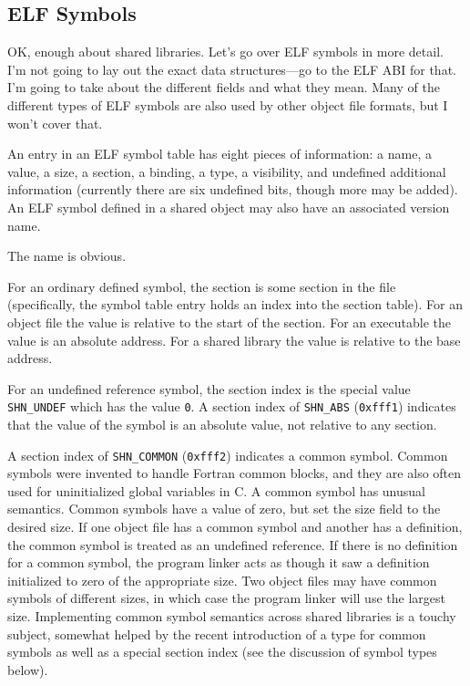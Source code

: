 \subsection{ELF Symbols}

OK, enough about shared libraries.  Let's go over ELF symbols in more detail.
I'm not going to lay out the exact data structures---go to the ELF ABI for
that.  I'm going to take about the different fields and what they mean.  Many
of the different types of ELF symbols are also used by other object file
formats, but I won't cover that.

An entry in an ELF symbol table has eight pieces of information: a name, a
value, a size, a section, a binding, a type, a visibility, and undefined
additional information (currently there are six undefined bits, though more may
be added).  An ELF symbol defined in a shared object may also have an
associated version name.

The name is obvious.

For an ordinary defined symbol, the section is some section in the file
(specifically, the symbol table entry holds an index into the section table).
For an object file the value is relative to the start of the section.  For an
executable the value is an absolute address.  For a shared library the value is
relative to the base address.

For an undefined reference symbol, the section index is the special value
\texttt{SHN\_UNDEF} which has the value \texttt{0}.  A section index of
\texttt{SHN\_ABS} (\texttt{0xfff1}) indicates that the value of the symbol is an
absolute value, not relative to any section.

A section index of \texttt{SHN\_COMMON} (\texttt{0xfff2}) indicates a common symbol.
Common symbols were invented to handle Fortran common blocks, and they are also
often used for uninitialized global variables in C.  A common symbol has
unusual semantics.  Common symbols have a value of zero, but set the size field
to the desired size.  If one object file has a common symbol and another has a
definition, the common symbol is treated as an undefined reference.  If there
is no definition for a common symbol, the program linker acts as though it saw
a definition initialized to zero of the appropriate size.  Two object files may
have common symbols of different sizes, in which case the program linker will
use the largest size.  Implementing common symbol semantics across shared
libraries is a touchy subject, somewhat helped by the recent introduction of a
type for common symbols as well as a special section index (see the discussion
of symbol types below).

